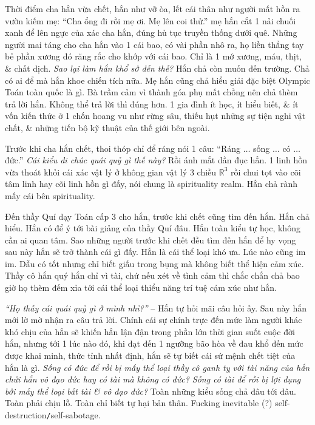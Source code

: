 \documentclass[12pt]{article}
\begin{document}
Thời điểm cha hắn vừa chết, hắn như vỡ òa, lết cái thân như người mất hồn ra vườn kiếm mẹ: ``Cha ổng đi rồi mẹ ơi. Mẹ lên coi thử.'' mẹ hắn cắt 1 nải chuối xanh để lên ngực của xác cha hắn, đúng hủ tục truyền thống dưới quê. Những người mai táng cho cha hắn vào 1 cái bao, có vài phần nhô ra, họ liền thẳng tay bẻ phần xương đó răng rắc cho khớp với cái bao. Chỉ là 1 mớ xương, máu, thịt, \& chất dịch. {\it Sao lại làm hắn khổ sở đến thế?} Hắn chả còn muốn đến trường. Chả có ai để mà hắn khoe chiến tích nữa. Mẹ hắn cũng chả hiểu giải đặc biệt Olympic Toán toàn quốc là gì. Bà trầm cảm vì thành góa phụ mất chồng nên chả thèm trả lời hắn. Không thể trả lời thì đúng hơn. 1 gia đình ít học, ít hiểu biết, \& ít vốn kiến thức ở 1 chốn hoang vu như rừng sâu, thiếu hụt những sự tiện nghi vật chất, \& những tiến bộ kỹ thuật của thế giới bên ngoài.

Trước khi cha hắn chết, thoi thóp chỉ để ráng nói 1 câu: ``Ráng $\ldots$ sống $\ldots$ có $\ldots$ đức.'' {\it Cái kiểu di chúc quái quỷ gì thế này?} Rồi ánh mắt dần đục hẳn. 1 linh hồn vừa thoát khỏi cái xác vật lý ở không gian vật lý 3 chiều $\mathbb{R}^3$ rồi chui tọt vào cõi tâm linh hay cõi linh hồn gì đấy, nói chung là spirituality realm. Hắn chả rành mấy cái bên spirituality.

Đến thầy Quí dạy Toán cấp 3 cho hắn, trước khi chết cũng tìm đến hắn. Hắn chả hiểu. Hắn có để ý tới bài giảng của thầy Quí đâu. Hắn toàn kiểu tự học, không cần ai quan tâm. Sao những người trước khi chết đều tìm đến hắn để hy vọng sau này hắn sẽ trở thành cái gì đấy. Hắn là cái thể loại khó ưa. Lúc nào cũng im im. Dẫu có tốt nhưng chỉ biết giấu trong bụng mà không biết thể hiện cảm xúc. Thầy cô hắn quý hắn chỉ vì tài, chứ nếu xét về tình cảm thì chắc chắn chả bao giờ họ thèm đếm xỉa tới cái thể loại thiểu năng trí tuệ cảm xúc như hắn.

{\it``Họ thấy cái quái quỷ gì ở mình nhỉ?''} -- Hắn tự hỏi mãi câu hỏi ấy. Sau này hắn mới lờ mờ nhận ra câu trả lời. Chính cái sự chính trực đến mức làm người khác khó chịu của hắn sẽ khiến hắn lận đận trong phần lớn thời gian suốt cuộc đời hắn, nhưng tới 1 lúc nào đó, khi đạt đến 1 ngưỡng bão hòa về đau khổ đến mức được khai minh, thức tỉnh nhất định, hắn sẽ tự biết cái sứ mệnh chết tiệt của hắn là gì. {\it Sống có đức để rồi bị mấy thể loại thầy cô ganh tỵ với tài năng của hắn chửi hắn vô đạo đức hay có tài mà không có đức? Sống có tài để rồi bị lợi dụng bởi mấy thể loại bất tài \& vô đạo đức?} Toàn những kiểu sống chả đâu tới đâu. Toàn phải chịu lỗ. Toàn chỉ biết tự hại bản thân. Fucking inevitable (?) self-destruction{\tt/}self-sabotage.
\end{document}
